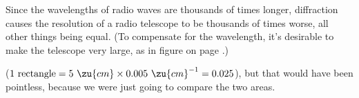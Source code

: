 Since the wavelengths of radio waves are thousands of times longer, diffraction causes the resolution
of a radio telescope to be thousands of times worse, all other things being equal. (To compensate
for the wavelength, it's desirable to make the telescope very large, as in figure
 on page \pageref{fig:very-large-array}.)

($1\ \text{rectangle}=5\ \zu{cm}\times0.005\ \zu{cm}^{-1}=0.025$), but that would
have been pointless, because we were just going to compare the two areas.





